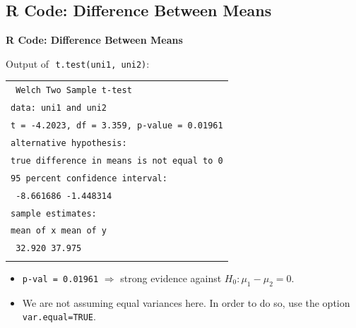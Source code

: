 \documentclass[compress]{beamer}        %
\makeatletter
\newcommand{\tcb}{\textcolor{beamer@blendedblue}}
\makeatother
\begin{document}
\subsection{R Code: Difference Between Means}
\begin{frame}{\bf \tcb{R Code: Difference Between Means}}

Output of\,\, \texttt{t.test(uni1, uni2)}:\\[0.3cm]

\begin{footnotesize}
\begin{tabular}{|l|}
\hline
\texttt{ Welch Two Sample t-test}\\[0.2cm]
\texttt{data:  uni1 and uni2}\\
\texttt{t = -4.2023, df = 3.359, p-value = 0.01961}\\
\texttt{alternative hypothesis:}\\
\texttt{true difference in means is not equal to 0}\\[0.1cm]
\texttt{95 percent confidence interval:}\\
\texttt{ -8.661686 -1.448314}\\
\texttt{sample estimates:}\\
\texttt{mean of x mean of y}\\
\texttt{   32.920    37.975}\\
\hline
\multicolumn{1}{c}{}\\[0.0cm]
\end{tabular}
\end{footnotesize}
\begin{itemize}\itemsep0.3cm
\item \texttt{p-val = 0.01961} $\Rightarrow$ strong evidence against $H_0:  \mu_1-\mu_2 = 0$.
\item We are not assuming equal variances here. In order to do so, use the option \texttt{var.equal=TRUE}.
\end{itemize}

\end{frame}
\end{document}
